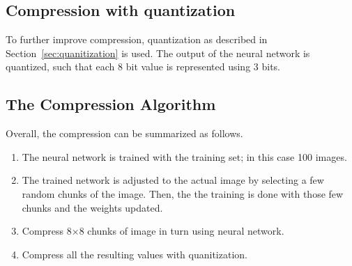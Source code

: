 \subsection{Compression with quantization}
To further improve compression, quantization as described in Section~\ref{sec:quanitization} is used. The output of the neural network is quantized, such that each 8 bit value is represented using 3 bits.  

\subsection{The Compression Algorithm}
\label{sec:compAlg}

Overall, the compression can be summarized as follows.

\begin{enumerate}
\item The neural network is trained with the training set; in this case 100 images.
\item The trained network is adjusted to the actual image by selecting a few random chunks of the image. Then, the the training is done with those few chunks and the weights updated. 
\item Compress 8$\times$8 chunks of image in turn using neural network.
\item Compress all the resulting values with quanitization.

\end{enumerate}
